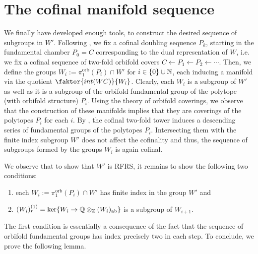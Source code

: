 \newpage
\section{The cofinal manifold sequence}

We finally have developed enough tools, to construct the desired sequence of subgroups in \(W'\).
Following , we fix a cofinal doubling sequence \(P_k\), starting in the fundamental chamber \(P_0 = C\) corresponding to the dual representation of \(W\), i.e. we fix a cofinal sequence of two-fold orbifold covers \(C \leftarrow P_1 \leftarrow P_2 \leftarrow \cdots\).
Then, we define the groups \(W_i := \pi_1^{\text{orb}}(P_i) \cap W'\) for \(i \in \{0\} \cup \mathbb{N}\), each inducing a manifold via the quotient \(\faktor{int(WC)}{W_i}\).
Clearly, each \(W_i\) is a subgroup of \(W'\) as well as it is a subgroup of the orbifold fundamental group of the polytope (with orbifold structure) \(P_i\).
Using the theory of orbifold coverings, we observe that the construction of these manifolds implies that they are coverings of the polytopes \(P_i\) for each \(i\).
By , the cofinal two-fold tower induces a descending series of fundamental groups of the polytopes \(P_i\).
Intersecting them with the finite index subgroup \(W'\) does not affect the cofinality and thus, the sequence of subgroups formed by the groups \(W_i\) is again cofinal.

\noindent
We observe that to show that \(W'\) is RFRS, it remains to show the following two conditions:
\begin{enumerate}
    \item each \(W_i := \pi_1^{\text{orb}}(P_i) \cap W'\) has finite index in the group \(W'\) and
    \item \((W_i)_r^{(1)} = \ker\{W_i \to \mathbb{Q} \otimes_{\mathbb{Z}} (W_i)_{\text{ab}}\}\) is a subgroup of \(W_{i+1}\).
\end{enumerate}
The first condition is essentially a consequence of the fact that the sequence of orbifold fundamental groups has index precisely two in each step.
To conclude, we prove the following lemma.

